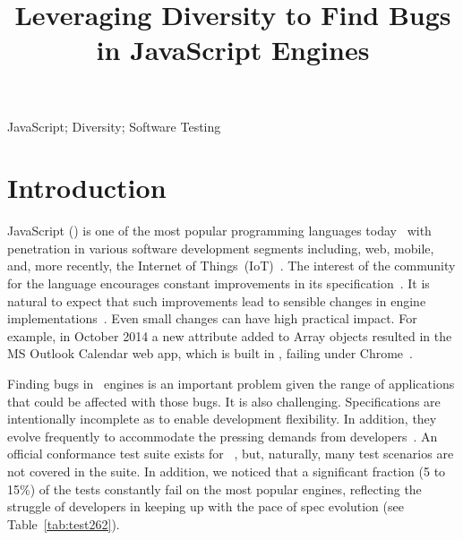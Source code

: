 \documentclass[10pt,conference,anonymous]{IEEEtran}
\begin{document}
\title{Leveraging Diversity to Find Bugs\\ in JavaScript Engines}


\maketitle

\thispagestyle{plain}
\pagestyle{plain}

\begin{abstract}
  
\end{abstract}

\begin{IEEEkeywords}
JavaScript; Diversity; Software Testing
\end{IEEEkeywords}

\section{Introduction}

JavaScript (\js{}) is one of the most popular programming languages
today~\cite{redmonk-javascript,stackify} with
penetration in various software development segments including, web, mobile,
and, more recently, the Internet of
Things~(IoT)~\cite{simply-technologies}. The interest of the community
for the language encourages constant improvements in its specification~\cite{ecmas262-spec}. It is natural to expect that such improvements
lead to sensible changes in engine implementations~\cite{kangax}. Even small
changes can have high practical impact. For example, in October 2014 a
new attribute added to Array objects resulted in the MS Outlook
Calendar web app, which is built in \js{}, failing under
Chrome~\cite{array-bug-chromium-issue4247,array-bug-discussion}.

Finding bugs in \js\ engines is an important problem given the range
of applications that could be affected with those bugs. It is also
challenging.  Specifications are intentionally incomplete as to enable
development flexibility. In addition, they evolve frequently to
accommodate the pressing demands from
developers~\cite{ecmas262-spec-repo}. An official conformance test
suite exists for \js~\cite{tc39-github}, but, naturally, many test
scenarios are not covered in the suite. In addition, we noticed that a
significant fraction (5 to 15\%) of the tests constantly fail on the
most popular engines, reflecting the struggle of developers in keeping
up with the pace of spec evolution (see Table~\ref{tab:test262}).
\end{document}
